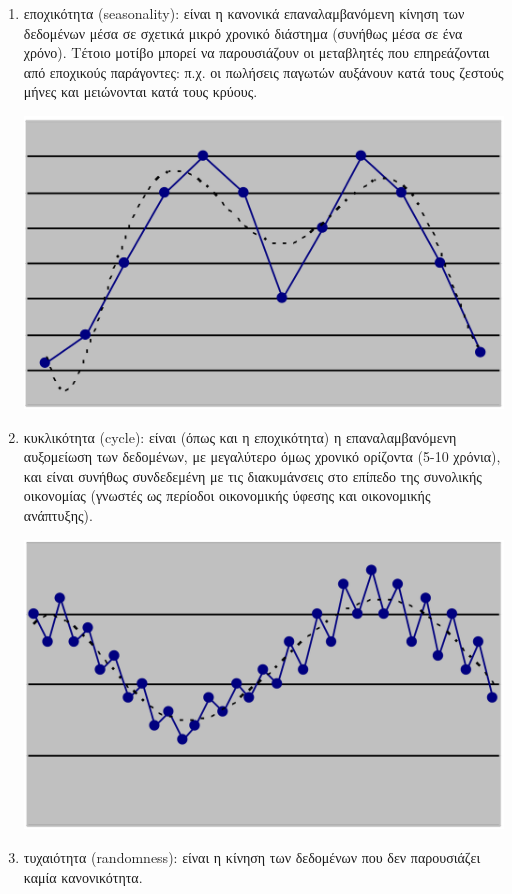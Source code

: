 \begin{enumerate}
\item εποχικότητα (seasonality): είναι η κανονικά επαναλαμβανόμενη κίνηση των
δεδομένων μέσα σε σχετικά μικρό χρονικό διάστημα (συνήθως μέσα σε ένα
χρόνο). Τέτοιο μοτίβο μπορεί να παρουσιάζουν οι μεταβλητές που
επηρεάζονται από εποχικούς παράγοντες: π.χ. οι πωλήσεις παγωτών αυξάνουν
κατά τους ζεστούς μήνες και μειώνονται κατά τους κρύους.
\begin{center}
\includegraphics[scale=0.2]{season.png}
\end{center}
\item κυκλικότητα (cycle): είναι (όπως και η εποχικότητα) η επαναλαμβανόμενη
αυξομείωση των δεδομένων, με μεγαλύτερο όμως χρονικό ορίζοντα (5-10
χρόνια), και είναι συνήθως συνδεδεμένη με τις διακυμάνσεις στο επίπεδο της
συνολικής οικονομίας (γνωστές ως περίοδοι οικονομικής ύφεσης και
οικονομικής ανάπτυξης).\\
\begin{center}
\includegraphics[scale=0.2]{cycle.png}
\end{center} 
\item τυχαιότητα (randomness): είναι η κίνηση των δεδομένων που δεν παρουσιάζει
καμία κανονικότητα.
\end{enumerate}
